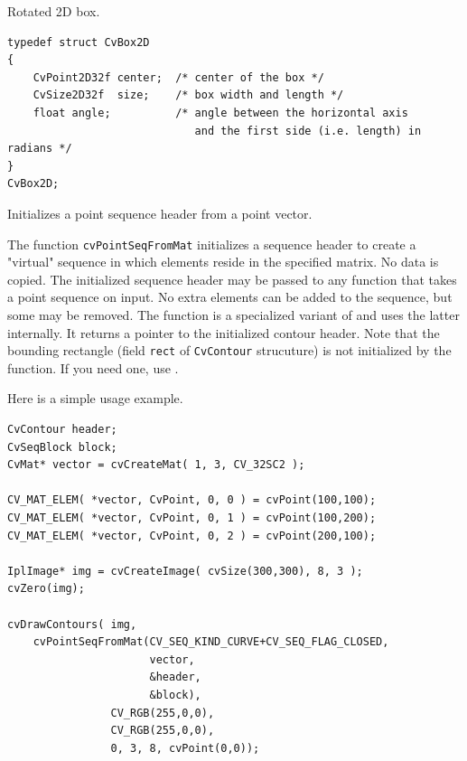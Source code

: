 \label{CvBox2D}

Rotated 2D box.

\begin{lstlisting}
typedef struct CvBox2D
{
    CvPoint2D32f center;  /* center of the box */
    CvSize2D32f  size;    /* box width and length */
    float angle;          /* angle between the horizontal axis
                             and the first side (i.e. length) in radians */
}
CvBox2D;
\end{lstlisting}

\label{PointSeqFromMat}

Initializes a point sequence header from a point vector.


\begin{description}
\end{description}

The function \texttt{cvPointSeqFromMat} initializes a sequence
header to create a "virtual" sequence in which elements reside in
the specified matrix. No data is copied. The initialized sequence
header may be passed to any function that takes a point sequence
on input. No extra elements can be added to the sequence,
but some may be removed. The function is a specialized variant of
 and uses
the latter internally. It returns a pointer to the initialized contour
header. Note that the bounding rectangle (field \texttt{rect} of
\texttt{CvContour} strucuture) is not initialized by the function. If
you need one, use .

Here is a simple usage example.

\begin{lstlisting}
CvContour header;
CvSeqBlock block;
CvMat* vector = cvCreateMat( 1, 3, CV_32SC2 );

CV_MAT_ELEM( *vector, CvPoint, 0, 0 ) = cvPoint(100,100);
CV_MAT_ELEM( *vector, CvPoint, 0, 1 ) = cvPoint(100,200);
CV_MAT_ELEM( *vector, CvPoint, 0, 2 ) = cvPoint(200,100);

IplImage* img = cvCreateImage( cvSize(300,300), 8, 3 );
cvZero(img);

cvDrawContours( img,
    cvPointSeqFromMat(CV_SEQ_KIND_CURVE+CV_SEQ_FLAG_CLOSED,
                      vector,
                      &header,
                      &block),
                CV_RGB(255,0,0),
                CV_RGB(255,0,0),
                0, 3, 8, cvPoint(0,0));
\end{lstlisting}

